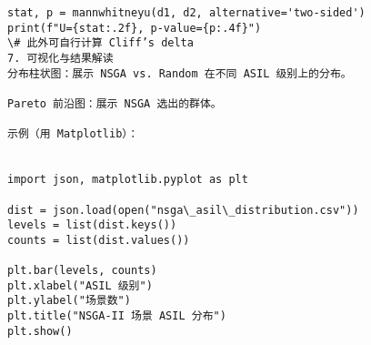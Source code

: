 \begin{lstlisting}
stat, p = mannwhitneyu(d1, d2, alternative='two-sided')
print(f"U={stat:.2f}, p-value={p:.4f}")
\# 此外可自行计算 Cliff’s delta
7. 可视化与结果解读
分布柱状图：展示 NSGA vs. Random 在不同 ASIL 级别上的分布。
  	
Pareto 前沿图：展示 NSGA 选出的群体。
  	
示例（用 Matplotlib）：
  	
  	
import json, matplotlib.pyplot as plt
  	
dist = json.load(open("nsga\_asil\_distribution.csv"))
levels = list(dist.keys())
counts = list(dist.values())
  	
plt.bar(levels, counts)
plt.xlabel("ASIL 级别")
plt.ylabel("场景数")
plt.title("NSGA-II 场景 ASIL 分布")
plt.show()
  \end{lstlisting}